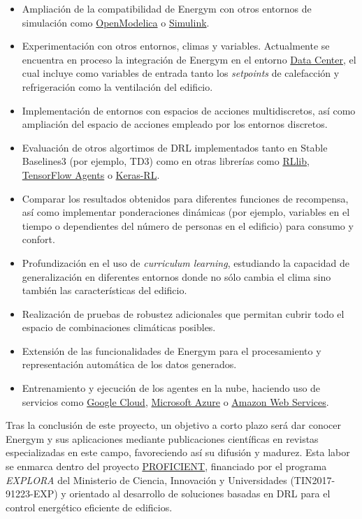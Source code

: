 \begin{itemize}
    \item Ampliación de la compatibilidad de Energym con otros entornos de simulación como \href{https://www.openmodelica.org/}{OpenModelica} o \href{https://es.mathworks.com/products/simulink.html}{Simulink}.
    \item Experimentación con otros entornos, climas y variables. Actualmente se encuentra en proceso la integración de Energym en el entorno  \href{https://github.com/NREL/EnergyPlus/blob/v8.6.0/testfiles/2ZoneDataCenterHVAC_wEconomizer.idf}{Data Center}, el cual incluye como variables de entrada tanto los \textit{setpoints} de calefacción y refrigeración como la ventilación del edificio.
    \item Implementación de entornos con espacios de acciones multidiscretos, así como ampliación del espacio de acciones empleado por los entornos discretos.
    \item Evaluación de otros algortimos de DRL implementados tanto en Stable Baselines3 (por ejemplo, TD3) como en otras librerías como \href{https://docs.ray.io/en/master/rllib.html}{RLlib}, \href{https://www.tensorflow.org/agents}{TensorFlow Agents} o \href{https://github.com/keras-rl/keras-rl}{Keras-RL}.
    \item Comparar los resultados obtenidos para diferentes funciones de recompensa, así como implementar ponderaciones dinámicas (por ejemplo, variables en el tiempo o dependientes del número de personas en el edificio) para consumo y confort.
    \item Profundización en el uso de \textit{curriculum learning}, estudiando la capacidad de generalización en diferentes entornos donde no sólo cambia el clima sino también las características del edificio.
    \item Realización de pruebas de robustez adicionales que permitan cubrir todo el espacio de combinaciones climáticas posibles.
    \item Extensión de las funcionalidades de Energym para el procesamiento y representación automática de los datos generados.
    \item Entrenamiento y ejecución de los agentes en la nube, haciendo uso de servicios como \href{https://cloud.google.com/}{Google Cloud}, \href{https://azure.microsoft.com/}{Microsoft Azure} o \href{https://aws.amazon.com/}{Amazon Web Services}.
\end{itemize}

Tras la conclusión de este proyecto, un objetivo a corto plazo será dar conocer Energym y sus aplicaciones mediante publicaciones científicas en revistas especializadas en este campo, favoreciendo así su difusión y madurez. Esta labor se enmarca dentro del proyecto \href{https://jgromero.github.io/proficient/}{PROFICIENT}, financiado por el programa \textit{EXPLORA} del Ministerio de Ciencia, Innovación y Universidades (TIN2017-91223-EXP) y orientado al desarrollo de soluciones basadas en DRL para el control energético eficiente de edificios.

